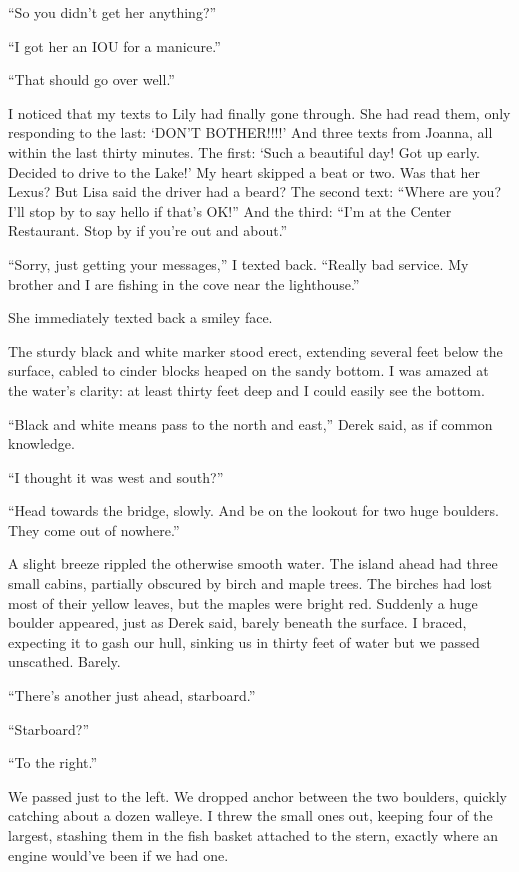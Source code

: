 ``So you didn't get her anything?''

``I got her an IOU for a manicure.''

``That should go over well.''

I noticed that my texts to Lily had finally gone through. She had read
them, only responding to the last: `DON'T BOTHER!!!!' And three texts
from Joanna, all within the last thirty minutes. The first: `Such a
beautiful day! Got up early. Decided to drive to the Lake!' My heart
skipped a beat or two. Was that her Lexus? But Lisa said the driver had
a beard? The second text: ``Where are you? I'll stop by to say hello if
that's OK!'' And the third: ``I'm at the Center Restaurant. Stop by if
you're out and about.''

``Sorry, just getting your messages,'' I texted back. ``Really bad
service. My brother and I are fishing in the cove near the lighthouse.''

She immediately texted back a smiley face.

The sturdy black and white marker stood erect, extending several feet
below the surface, cabled to cinder blocks heaped on the sandy bottom. I
was amazed at the water's clarity: at least thirty feet deep and I could
easily see the bottom.

``Black and white means pass to the north and east,'' Derek said, as if
common knowledge.

``I thought it was west and south?''

``Head towards the bridge, slowly. And be on the lookout for two huge
boulders. They come out of nowhere.''

A slight breeze rippled the otherwise smooth water. The island ahead had
three small cabins, partially obscured by birch and maple trees. The
birches had lost most of their yellow leaves, but the maples were bright
red. Suddenly a huge boulder appeared, just as Derek said, barely
beneath the surface. I braced, expecting it to gash our hull, sinking us
in thirty feet of water but we passed unscathed. Barely.

``There's another just ahead, starboard.''

``Starboard?''

``To the right.''

We passed just to the left. We dropped anchor between the two boulders,
quickly catching about a dozen walleye. I threw the small ones out,
keeping four of the largest, stashing them in the fish basket attached
to the stern, exactly where an engine would've been if we had one.

